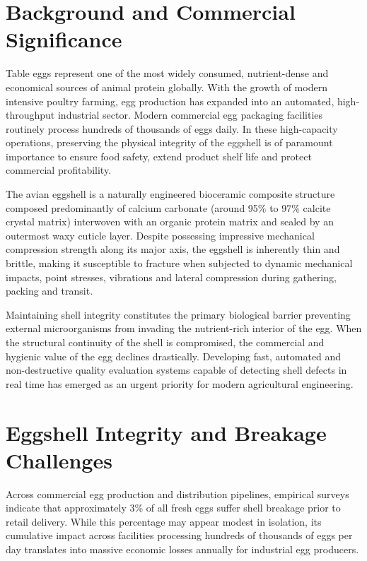 \documentclass[12pt,a4paper]{report}
\begin{document}
\section{Background and Commercial Significance}

Table eggs represent one of the most widely consumed, nutrient-dense and economical sources of animal protein globally. With the growth of modern intensive poultry farming, egg production has expanded into an automated, high-throughput industrial sector. Modern commercial egg packaging facilities routinely process hundreds of thousands of eggs daily. In these high-capacity operations, preserving the physical integrity of the eggshell is of paramount importance to ensure food safety, extend product shelf life and protect commercial profitability.

The avian eggshell is a naturally engineered bioceramic composite structure composed predominantly of calcium carbonate (around 95\% to 97\% calcite crystal matrix) interwoven with an organic protein matrix and sealed by an outermost waxy cuticle layer. Despite possessing impressive mechanical compression strength along its major axis, the eggshell is inherently thin and brittle, making it susceptible to fracture when subjected to dynamic mechanical impacts, point stresses, vibrations and lateral compression during gathering, packing and transit.

Maintaining shell integrity constitutes the primary biological barrier preventing external microorganisms from invading the nutrient-rich interior of the egg. When the structural continuity of the shell is compromised, the commercial and hygienic value of the egg declines drastically. Developing fast, automated and non-destructive quality evaluation systems capable of detecting shell defects in real time has emerged as an urgent priority for modern agricultural engineering.

\section{Eggshell Integrity and Breakage Challenges}

Across commercial egg production and distribution pipelines, empirical surveys indicate that approximately 3\% of all fresh eggs suffer shell breakage prior to retail delivery. While this percentage may appear modest in isolation, its cumulative impact across facilities processing hundreds of thousands of eggs per day translates into massive economic losses annually for industrial egg producers.
\end{document}
